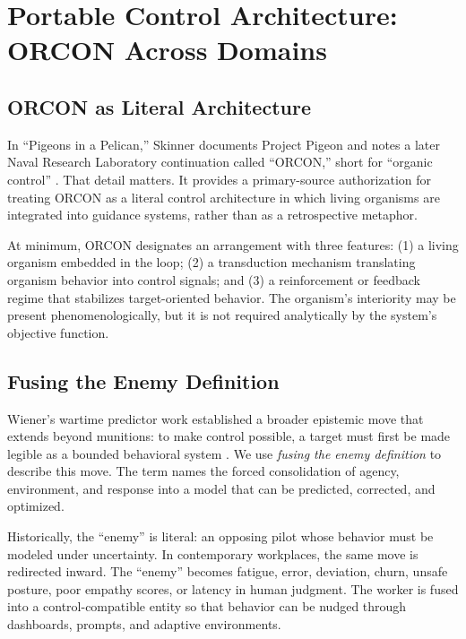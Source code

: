 \documentclass[runningheads]{llncs}
\begin{document}
\section{Portable Control Architecture: ORCON Across Domains}

\subsection{ORCON as Literal Architecture}

In ``Pigeons in a Pelican,'' Skinner documents Project Pigeon and notes a later Naval Research Laboratory continuation called ``ORCON,'' short for ``organic control'' \cite{skinner1960pigeons}. That detail matters. It provides a primary-source authorization for treating ORCON as a literal control architecture in which living organisms are integrated into guidance systems, rather than as a retrospective metaphor.

At minimum, ORCON designates an arrangement with three features: (1) a living organism embedded in the loop; (2) a transduction mechanism translating organism behavior into control signals; and (3) a reinforcement or feedback regime that stabilizes target-oriented behavior. The organism's interiority may be present phenomenologically, but it is not required analytically by the system's objective function.

\subsection{Fusing the Enemy Definition}

Wiener's wartime predictor work established a broader epistemic move that extends beyond munitions: to make control possible, a target must first be made legible as a bounded behavioral system \cite{wiener1948cybernetics}. We use \emph{fusing the enemy definition} to describe this move. The term names the forced consolidation of agency, environment, and response into a model that can be predicted, corrected, and optimized.

Historically, the ``enemy'' is literal: an opposing pilot whose behavior must be modeled under uncertainty. In contemporary workplaces, the same move is redirected inward. The ``enemy'' becomes fatigue, error, deviation, churn, unsafe posture, poor empathy scores, or latency in human judgment. The worker is fused into a control-compatible entity so that behavior can be nudged through dashboards, prompts, and adaptive environments.
\end{document}
